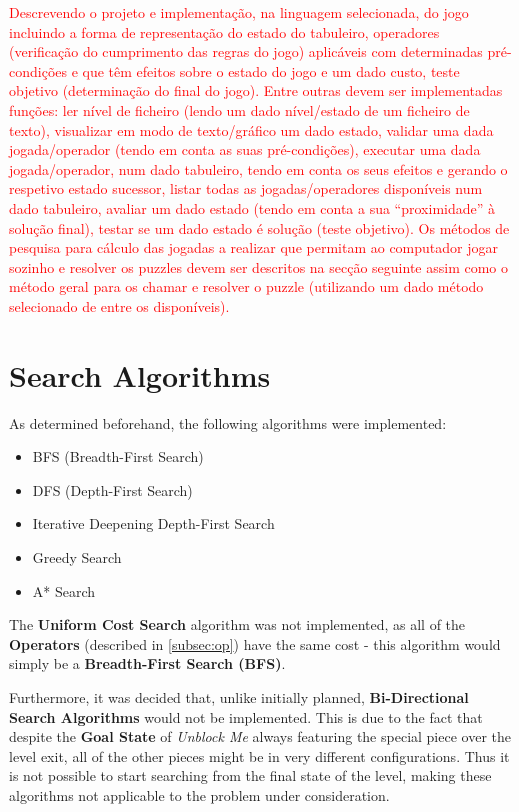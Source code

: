 \documentclass[conference]{IEEEtran}
\begin{document}
\textcolor{red}{Descrevendo o projeto e implementação, na linguagem selecionada, do jogo incluindo a forma de representação do estado do tabuleiro, operadores (verificação do cumprimento das regras do jogo) aplicáveis com determinadas pré-condições e que têm efeitos sobre o estado do jogo e um dado custo, teste objetivo (determinação do final do jogo). Entre outras devem ser implementadas funções: ler nível de ficheiro (lendo um dado nível/estado de um ficheiro de texto), visualizar em modo de texto/gráfico um dado estado, validar uma dada jogada/operador (tendo em conta as suas pré-condições), executar uma dada jogada/operador, num dado tabuleiro, tendo em conta os seus efeitos e gerando o respetivo estado sucessor, listar todas as jogadas/operadores disponíveis num dado tabuleiro, avaliar um dado estado (tendo em conta a sua “proximidade” à solução final), testar se um dado estado é solução (teste objetivo). Os métodos de pesquisa para cálculo das jogadas a realizar que permitam ao computador jogar sozinho e resolver os puzzles devem ser descritos na secção seguinte assim como o método geral para os chamar e resolver o puzzle (utilizando um dado método selecionado de entre os disponíveis).}

\section{Search Algorithms} \label{sec:sa}
As determined beforehand, the following algorithms were implemented:
\begin{itemize}
    \item BFS (Breadth-First Search)
    \item DFS (Depth-First Search)
    \item Iterative Deepening Depth-First Search
    \item Greedy Search
    \item A* Search
\end{itemize}

The \textbf{Uniform Cost Search} algorithm was not implemented, as all of the \textbf{Operators} (described in \autoref{subsec:op}) have the same cost - this algorithm would simply be a \textbf{Breadth-First Search (BFS)}.

Furthermore, it was decided that, unlike initially planned, \textbf{Bi-Directional Search Algorithms} would not be implemented. This is due to the fact that despite the \textbf{Goal State} of \textit{Unblock Me} always featuring the special piece over the level exit, all of the other pieces might be in very different configurations. Thus it is not possible to start searching from the final state of the level, making these algorithms not applicable to the problem under consideration.
\end{document}
